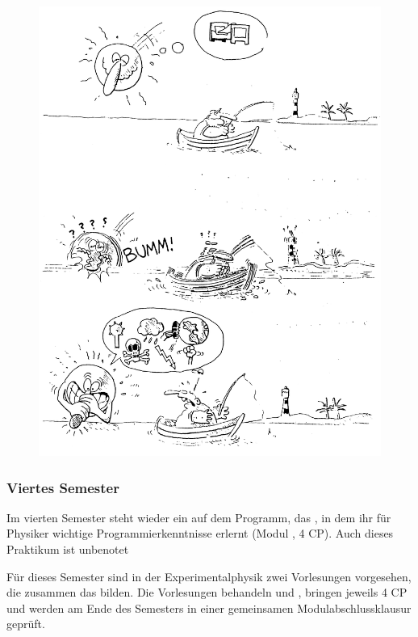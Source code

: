 \begin{figure}[p]
  \includegraphics[height=\textheight]{bilder/sonnendotz.jpg}
\end{figure}

\subsubsection{Viertes Semester}

Im vierten Semester steht wieder ein  auf dem Programm, das , in dem ihr für Physiker wichtige Programmierkenntnisse erlernt (Modul , 4 CP). Auch dieses Praktikum ist unbenotet
\bigskip

Für dieses Semester sind in der Experimentalphysik zwei Vorlesungen vorgesehen, die zusammen das  bilden. Die Vorlesungen behandeln  und , bringen jeweils 4 CP und werden am Ende des Semesters in einer gemeinsamen Modulabschlussklausur geprüft.

